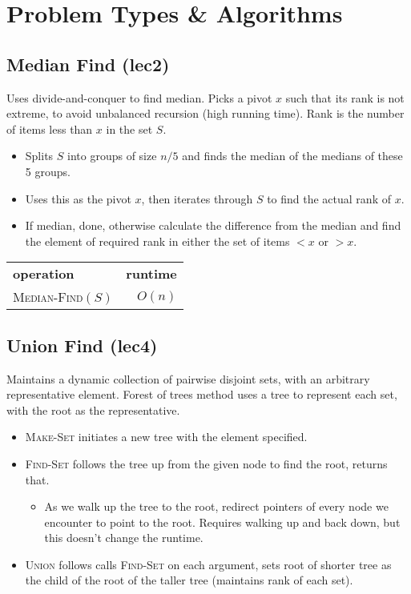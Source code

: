 \documentclass{article}
\begin{document}
\section{Problem Types \& Algorithms}
\begin{multicols}{2}
	\subsection{Median Find (lec2)}
	Uses divide-and-conquer to find median. Picks a pivot $x$ such that its rank is not extreme, to avoid unbalanced recursion (high running time). Rank is the number of items less than $x$ in the set $S$. 
\begin{itemize}[noitemsep, topsep=0pt]
	\item Splits $S$ into groups of size $n/5$ and finds the median of the medians of these 5 groups.
	\item Uses this as the pivot $x$, then iterates through $S$ to find the actual rank of $x$. 
	\item If median, done, otherwise calculate the difference from the median and find the element of required rank in either the set of items $< x$ or $>x$.
\end{itemize}

	\begin{center}
		\begin{tabular}{lr}
			\textbf{operation} & \textbf{runtime} \\
			\textsc{Median-Find}$(S)$ & $O(n)$ \\
		\end{tabular}
	\end{center}

	\subsection{Union Find (lec4)}
	Maintains a dynamic collection of pairwise disjoint sets, with an arbitrary representative element. Forest of trees method uses a tree to represent each set, with the root as the representative. 
	\begin{itemize}[topsep=0pt, noitemsep]
		\item \textsc{Make-Set} initiates a new tree with the element specified. 
		\item \textsc{Find-Set} follows the tree up from the given node to find the root, returns that.
			\begin{itemize}
				\item As we walk up the tree to the root, redirect pointers of every node we encounter to point to the root. Requires walking up and back down, but this doesn't change the runtime.          
			\end{itemize}
		\item \textsc{Union} follows calls \textsc{Find-Set} on each argument, sets root of shorter tree as the child of the root of the taller tree (maintains rank of each set).
	\end{itemize}


\end{multicols}
\end{document}
